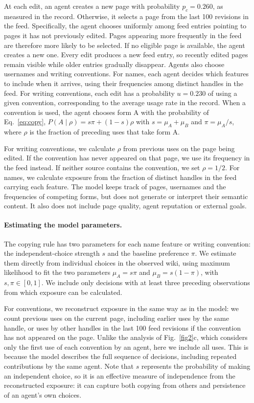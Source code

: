 \documentclass[11pt]{article}
\begin{document}
At each edit, an agent creates a new page with probability $p_c=0.260$, as measured in the record. Otherwise, it selects a page from the last 100 revisions in the feed. Specifically, the agent chooses uniformly among feed entries pointing to pages it has not previously edited. Pages appearing more frequently in the feed are therefore more likely to be selected. If no eligible page is available, the agent creates a new one. Every edit produces a new feed entry, so recently edited pages remain visible while older entries gradually disappear. Agents also choose usernames and writing conventions. For names, each agent decides which features to include when it arrives, using their frequencies among distinct handles in the feed. For writing conventions, each edit has a probability $u=0.230$ of using a given convention, corresponding to the average usage rate in the record. When a convention is used, the agent chooses form A with the probability of Eq.~\eqref{eq:copy}, $P(A\mid\rho)=s\pi+(1-s)\rho$ with $s=\mu_A+\mu_B$ and $\pi=\mu_A/s$, where $\rho$ is the fraction of preceding uses that take form A.

For writing conventions, we calculate $\rho$ from previous uses on the page being edited. If the convention has never appeared on that page, we use its frequency in the feed instead. If neither source contains the convention, we set $\rho=1/2$. For names, we calculate exposure from the fraction of distinct handles in the feed carrying each feature. The model keeps track of pages, usernames and the frequencies of competing forms, but does not generate or interpret their semantic content. It also does not include page quality, agent reputation or external goals.

\paragraph{Estimating the model parameters.}
The copying rule has two parameters for each name feature or writing convention: the independent-choice strength $s$ and the baseline preference $\pi$. We estimate them directly from individual choices in the observed wiki, using maximum likelihood to fit the two parameters $\mu_A=s\pi$ and $\mu_B=s(1-\pi)$, with $s,\pi\in[0,1]$. We include only decisions with at least three preceding observations from which exposure can be calculated.

For conventions, we reconstruct exposure in the same way as in the model: we count previous uses on the current page, including earlier uses by the same handle, or uses by other handles in the last 100 feed revisions if the convention has not appeared on the page. Unlike the analysis of Fig.~\ref{fig2}c, which considers only the first use of each convention by an agent, here we include all uses. This is because the model describes the full sequence of decisions, including repeated contributions by the same agent. Note that $s$ represents the probability of making an independent choice, so it is an effective measure of independence from the reconstructed exposure: it can capture both copying from others and persistence of an agent's own choices.
\end{document}
